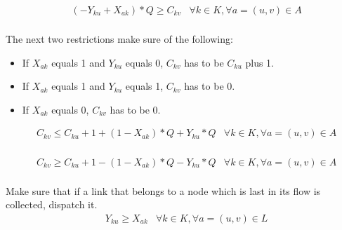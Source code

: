 \begin{align*}
        &(-Y_{ku} + X_{ak}) * Q \geq C_{kv} & \forall k \in K, \forall a = (u,v) \in A \\
\end{align*}

The next two restrictions make sure of the following: \\

\begin{itemize}
    \item If $X_{ak}$ equals 1 and $Y_{ku}$ equals 0, $C_{kv}$ has to be $C_{ku}$ plus 1. \\
    \item If $X_{ak}$ equals 1 and $Y_{ku}$ equals 1, $C_{kv}$ has to be 0. \\
    \item If $X_{ak}$ equals 0, $C_{kv}$ has to be 0. \\
\end{itemize}

\begin{align*}
    &C_{kv} \leq C_{ku} + 1 + (1 - X_{ak}) * Q + Y_{ku} * Q & \forall k \in K, \forall a = (u,v) \in A \\
\end{align*}

\begin{align*}
     &C_{kv} \geq C_{ku} + 1 - (1 - X_{ak}) * Q - Y_{ku} * Q & \forall k \in K, \forall a = (u,v) \in A \\
\end{align*}

        
Make sure that if a link that belongs to a node which is last in its flow is collected, dispatch it. \\

\begin{align*}
    &Y_{ku} \geq X_{ak} & \forall k \in K, \forall a = (u,v) \in L \\
\end{align*}
